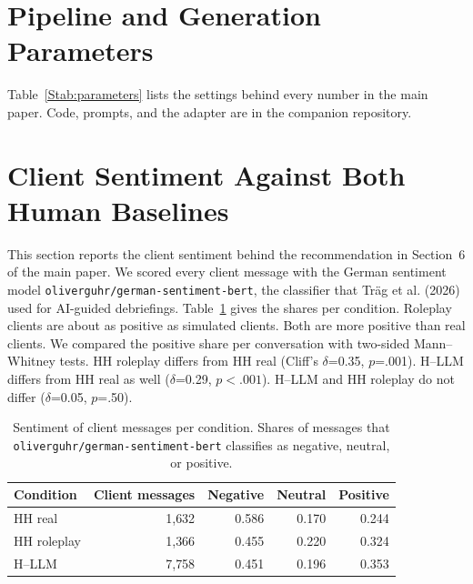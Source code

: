 \documentclass[fleqn,10pt]{JLA_article}
\begin{document}
\section{Pipeline and Generation Parameters}
\label{Ssec:parameters}
Table~\ref{Stab:parameters} lists the settings behind every number in the main paper. Code, prompts, and the adapter are in the companion repository.

\begin{table}[t]
\caption{Pipeline and generation parameters.}
\label{Stab:parameters}
\centering
\footnotesize
\setlength{\tabcolsep}{4pt}

\end{table}

\section{Client Sentiment Against Both Human Baselines}
\label{Ssec:sentiment}
This section reports the client sentiment behind the recommendation in Section~6 of the main paper. We scored every client message with the German sentiment model \texttt{oliverguhr/german-sentiment-bert}, the classifier that Tr\"ag et al. (2026) used for AI-guided debriefings. Table~\ref{Stab:sentiment} gives the shares per condition. Roleplay clients are about as positive as simulated clients. Both are more positive than real clients. We compared the positive share per conversation with two-sided Mann--Whitney tests. HH roleplay differs from HH real (Cliff's $\delta$=0.35, $p$=.001). H--LLM differs from HH real as well ($\delta$=0.29, $p<.001$). H--LLM and HH roleplay do not differ ($\delta$=0.05, $p$=.50).

\begin{table}[t]
\caption{Sentiment of client messages per condition. Shares of messages that \texttt{oliverguhr/german-sentiment-bert} classifies as negative, neutral, or positive.}
\label{Stab:sentiment}
\centering
\footnotesize
\begin{tabular}{lrrrr}
\toprule
Condition & Client messages & Negative & Neutral & Positive \\
\midrule
HH real & 1{,}632 & 0.586 & 0.170 & 0.244 \\
HH roleplay & 1{,}366 & 0.455 & 0.220 & 0.324 \\
H--LLM & 7{,}758 & 0.451 & 0.196 & 0.353 \\
\bottomrule
\end{tabular}
\end{table}
\end{document}
